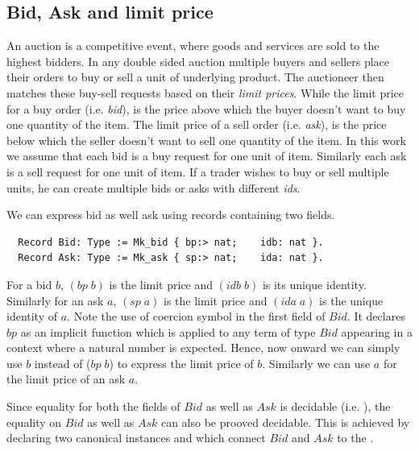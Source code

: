 \documentclass[a4paper,UKenglish,cleveref, autoref]{lipics-v2019}
\begin{document}
\subsection{Bid, Ask and limit price}
An auction is a  competitive event, where goods and services are sold to the highest bidders. In  any double sided auction multiple buyers and sellers place their orders to buy or sell a unit of underlying product. The  auctioneer then matches these buy-sell requests  based on their \emph{limit prices}. While the limit price for a buy order (i.e. \emph{bid}), is the price above which the buyer doesn't want to buy one quantity of the item. The limit price of a sell order (i.e. \emph{ask}), is the price below which the seller doesn't want to sell one quantity of the item.  In this work we assume that each bid is a buy request for one unit of item. Similarly each ask is a sell request for one unit of item. If a trader wishes to buy or sell multiple units, he can create multiple bids or asks with different \emph{ids}. 

We can express bid as well ask using  records containing two fields. 
\begin{verbatim}
  Record Bid: Type := Mk_bid { bp:> nat;    idb: nat }.
  Record Ask: Type := Mk_ask { sp:> nat;    ida: nat }.
\end{verbatim}
For a bid $b$, $(bp \; b)$  is the limit price and $(idb \; b)$ is its unique identity. Similarly for an ask $a$, $(sp \; a)$ is the limit price and $(ida \; a)$ is the unique identity of $a$. Note the use of coercion symbol \tw{ :>} in the first field of $Bid$. It declares $bp$ as an implicit function which is applied  to any term of type $Bid$ appearing in a context where a natural number is expected. Hence, now onward we can simply use $b$ instead of  ($bp \;b$) to express the limit price of $b$. Similarly we can use $a$ for the limit price of an ask $a$.


Since equality for both the fields of $Bid$ as well as $Ask$ is decidable (i.e. ), the equality on $Bid$ as well as $Ask$ can also be prooved decidable. This is achieved by declaring two canonical instances  and  which connect $Bid$ and $Ask$ to the .  
\end{document}
